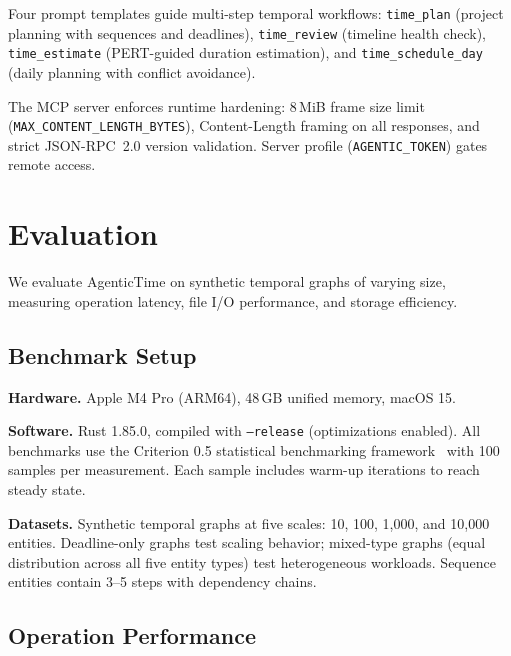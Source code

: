 \documentclass[10pt, twocolumn]{article}
\begin{document}
Four prompt templates guide multi-step temporal workflows: \texttt{time\_plan} (project planning with sequences and deadlines), \texttt{time\_review} (timeline health check), \texttt{time\_estimate} (PERT-guided duration estimation), and \texttt{time\_schedule\_day} (daily planning with conflict avoidance).

The MCP server enforces runtime hardening: 8\,MiB frame size limit (\texttt{MAX\_CONTENT\_LENGTH\_BYTES}), Content-Length framing on all responses, and strict JSON-RPC~2.0 version validation. Server profile (\texttt{AGENTIC\_TOKEN}) gates remote access.


\section{Evaluation}
\label{sec:evaluation}

We evaluate AgenticTime on synthetic temporal graphs of varying size, measuring operation latency, file I/O performance, and storage efficiency.

\subsection{Benchmark Setup}

\textbf{Hardware.} Apple M4 Pro (ARM64), 48\,GB unified memory, macOS 15.

\textbf{Software.} Rust 1.85.0, compiled with \texttt{--release} (optimizations enabled). All benchmarks use the Criterion 0.5 statistical benchmarking framework~\cite{criterion} with 100 samples per measurement. Each sample includes warm-up iterations to reach steady state.

\textbf{Datasets.} Synthetic temporal graphs at five scales: 10, 100, 1{,}000, and 10{,}000 entities. Deadline-only graphs test scaling behavior; mixed-type graphs (equal distribution across all five entity types) test heterogeneous workloads. Sequence entities contain 3--5 steps with dependency chains.

\subsection{Operation Performance}
\end{document}

